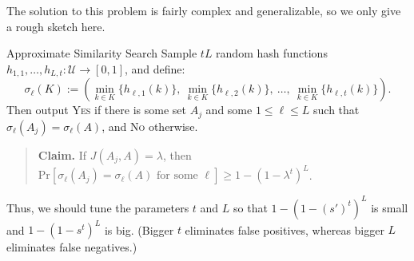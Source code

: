 The solution to this problem is fairly complex and generalizable, so we only give a rough sketch here.

\begin{solution}{Approximate Similarity Search}
    Sample $tL$ random hash functions $h_{1, 1}, \dots, h_{L, t}: \mathcal{U} \to [0, 1]$, and define:
    \[ \sigma_{\ell}(K) := \left( \underset{k \in K}{\min} \{ h_{\ell, 1}(k) \}, \ \underset{k \in K}{\min} \{ h_{\ell, 2}(k) \}, \ \dots, \ \underset{k \in K}{\min} \{ h_{\ell, t}(k) \} \right). \]
    Then output \textsc{Yes} if there is some set $A_j$ and some $1 \leq \ell \leq L$ such that $\sigma_{\ell}(A_j) = \sigma_{\ell}(A)$, and \textsc{No} otherwise.
    \begin{quote}
        \textbf{Claim.} If $J(A_j, A) = \lambda$, then $\mathrm{Pr}[\sigma_{\ell}(A_j) = \sigma_{\ell}(A) \text{ for some } \ell] \geq 1 - (1 - \lambda^t)^L$. 
    \end{quote}
    Thus, we should tune the parameters $t$ and $L$ so that $1 - (1 - (s')^t)^L$ is small and $1 - (1 - s^t)^L$ is big.  (Bigger $t$ eliminates false positives, whereas bigger $L$ eliminates false negatives.)
\end{solution}

